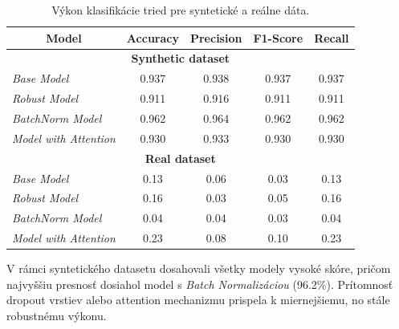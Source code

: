 \documentclass[a4paper,conference]{IEEEtran}
\begin{document}
\begin{table}[]
\caption{Výkon klasifikácie tried pre syntetické a reálne dáta.}
\label{tab:performance}
\begin{tabular}{|lcccc|}
\hline
\multicolumn{1}{|c|}{\textbf{Model}} & \multicolumn{1}{c|}{\textbf{Accuracy}} & \multicolumn{1}{c|}{\textbf{Precision}} & \multicolumn{1}{c|}{\textbf{F1-Score}} & \textbf{Recall} \\ \hline
\multicolumn{5}{|c|}{\textbf{Synthetic dataset}}                  \\ \hline
\multicolumn{1}{|l|}{\textit{Base Model}} & \multicolumn{1}{c|}{0.937} & \multicolumn{1}{c|}{0.938} & \multicolumn{1}{c|}{0.937} & 0.937 \\ \hline
\multicolumn{1}{|l|}{\textit{Robust Model}} & \multicolumn{1}{c|}{0.911} & \multicolumn{1}{c|}{0.916} & \multicolumn{1}{c|}{0.911} & 0.911 \\ \hline
\multicolumn{1}{|l|}{\textit{BatchNorm Model}} & \multicolumn{1}{c|}{0.962} & \multicolumn{1}{c|}{0.964} & \multicolumn{1}{c|}{0.962} & 0.962 \\ \hline
\multicolumn{1}{|l|}{\textit{Model with Attention}} & \multicolumn{1}{c|}{0.930} & \multicolumn{1}{c|}{0.933} & \multicolumn{1}{c|}{0.930} & 0.930 \\ \hline
\multicolumn{5}{|c|}{\textbf{Real dataset}} \\ \hline
\multicolumn{1}{|l|}{\textit{Base Model}} & \multicolumn{1}{c|}{0.13} & \multicolumn{1}{c|}{0.06} & \multicolumn{1}{c|}{0.03} & 0.13 \\ \hline
\multicolumn{1}{|l|}{\textit{Robust Model}} & \multicolumn{1}{c|}{0.16} & \multicolumn{1}{c|}{0.03} & \multicolumn{1}{c|}{0.05} & 0.16 \\ \hline
\multicolumn{1}{|l|}{\textit{BatchNorm Model}} & \multicolumn{1}{c|}{0.04} & \multicolumn{1}{c|}{0.04} & \multicolumn{1}{c|}{0.03} & 0.04 \\ \hline
\multicolumn{1}{|l|}{\textit{Model with Attention}} & \multicolumn{1}{c|}{0.23} & \multicolumn{1}{c|}{0.08} & \multicolumn{1}{c|}{0.10} & 0.23 \\ \hline
\end{tabular}
\end{table}

V rámci syntetického datasetu dosahovali všetky modely vysoké skóre, pričom najvyššiu presnosť dosiahol model s \textit{Batch Normalizáciou} (96.2\%). Prítomnosť dropout vrstiev alebo attention mechanizmu prispela k miernejšiemu, no stále robustnému výkonu.
\end{document}
